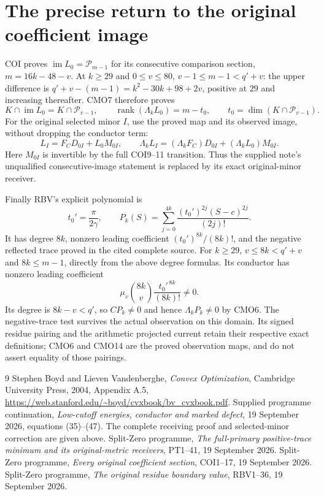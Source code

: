 \documentclass[11pt]{article}
\newcommand{\im}{\operatorname{im}}
\begin{document}
\section{The precise return to the original coefficient image}
COI proves $\im L_0=\mathcal P_{m-1}$ for its consecutive
comparison section, $m=16k-48-v$. At $k\ge29$ and $0\le v\le80$,
$v-1\le m-1<q'+v$: the upper difference is
$q'+v-(m-1)=k^2-30k+98+2v$, positive at $29$
and increasing thereafter. CMO7 therefore proves
\begin{equation}\tag{CMO13}
 K\cap\im L_0=K\cap\mathcal P_{v-1},\qquad
 \operatorname{rank}(\Lambda_k L_0)=m-t_0,\qquad
 t_0=\dim(K\cap\mathcal P_{v-1}).
\end{equation}
For the original selected minor $I$, use the proved map
and its observed image, without dropping the conductor term:
\begin{equation}\tag{CMO14}
 \boxed{L_I=F_CD_{0I}+L_0M_{0I},\qquad
 \Lambda_kL_I=(\Lambda_kF_C)D_{0I}
                          +(\Lambda_kL_0)M_{0I}.}
\end{equation}
Here $M_{0I}$ is invertible by the full COI9--11 transition.
Thus the supplied note's unqualified consecutive-image statement
is replaced by its exact original-minor receiver.

Finally RBV's explicit polynomial \cite{RBV} is
\[
 t_0'=\frac{\pi}{2\gamma},\qquad
 P_k(S)=\sum_{j=0}^{4k}\frac{(t_0')^{2j}(S-c)^{2j}}{(2j)!}.
\]
It has degree $8k$, nonzero leading coefficient
$(t_0')^{8k}/(8k)!$, and the negative reflected trace proved
in the cited complete source. For $k\ge29$,
$v\le8k<q'+v$ and $8k\le m-1$, directly from the above
degree formulas. Its conductor has nonzero leading coefficient
\begin{equation}\tag{CMO15}
 \mu_v\binom{8k}{v}\frac{t_0'^{\,8k}}{(8k)!}\ne0 .
\end{equation}
Its degree is $8k-v<q'$, so $CP_k\ne0$ and hence
$\Lambda_kP_k\ne0$ by CMO6. The negative-trace test survives
the actual observation on this domain. Its signed residue
pairing and the arithmetic projected current retain their
respective exact definitions; CMO6 and CMO14 are the proved
observation maps, and do not assert equality of those pairings.

\begin{thebibliography}{9}
 Stephen Boyd and Lieven Vandenberghe,
\emph{Convex Optimization}, Cambridge University Press, 2004,
Appendix A.5,
\url{https://web.stanford.edu/~boyd/cvxbook/bv_cvxbook.pdf}.
 Supplied programme continuation,
\emph{Low-cutoff energies, conductor and marked defect},
19 September 2026, equations (35)--(47).
The complete receiving proof and selected-minor correction
are given above.
 Split-Zero programme,
\emph{The full-primary positive-trace minimum and its original-metric
receivers}, PT1--41, 19 September 2026.
 Split-Zero programme,
\emph{Every original coefficient section}, COI1--17,
19 September 2026.
 Split-Zero programme,
\emph{The original residue boundary value}, RBV1--36,
19 September 2026.
\end{thebibliography}
\end{document}
